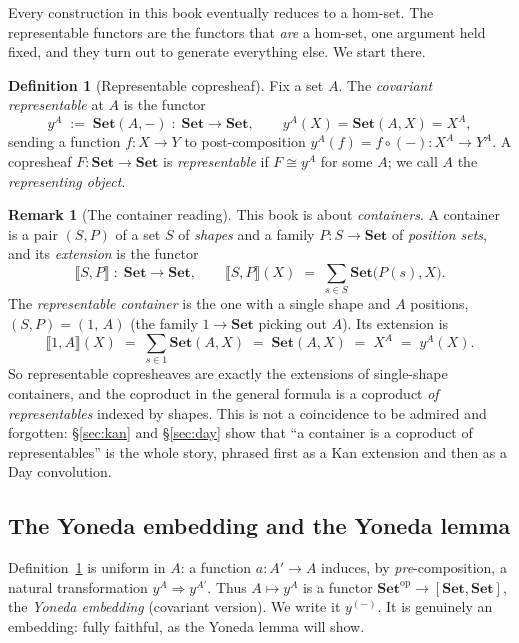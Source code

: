 \documentclass[11pt]{article}
\theoremstyle{plain}
\theoremstyle{definition}
\newtheorem{definition}[theorem]{Definition}
\newtheorem{remark}[theorem]{Remark}
\newcommand{\Set}{\mathbf{Set}}
\newcommand{\op}{^{\mathrm{op}}}
\newcommand{\yA}{y^{A}}
\newcommand{\iso}{\cong}
\newcommand{\ext}[1]{\llbracket #1 \rrbracket}
\begin{document}
Every construction in this book eventually reduces to a hom-set. The
representable functors are the functors that \emph{are} a hom-set, one argument
held fixed, and they turn out to generate everything else. We start there.

\begin{definition}[Representable copresheaf]
\label{def:rep}
Fix a set $A$. The \emph{covariant representable} at $A$ is the functor
\[
  \yA \;:=\; \Set(A,-)\;:\;\Set \longrightarrow \Set,
  \qquad
  \yA(X) = \Set(A,X) = X^{A},
\]
sending a function $f\colon X\to Y$ to post-composition
$\yA(f) = f\circ(-)\colon X^{A}\to Y^{A}$. A copresheaf $F\colon\Set\to\Set$ is
\emph{representable} if $F\iso\yA$ for some $A$; we call $A$ the
\emph{representing object}.
\end{definition}

\begin{remark}[The container reading]
\label{rem:containerrep}
This book is about \emph{containers}. A container is a pair $(S,P)$ of a set $S$
of \emph{shapes} and a family $P\colon S\to\Set$ of \emph{position sets}, and its
\emph{extension} is the functor
\[
  \ext{S,P}\;:\;\Set\to\Set,
  \qquad
  \ext{S,P}(X) \;=\; \sum_{s\in S}\Set\!\bigl(P(s),X\bigr).
\]
The \emph{representable container} is the one with a single shape and $A$
positions, $(S,P)=(1,\,A)$ (the family $1\to\Set$ picking out $A$). Its extension
is
\[
  \ext{1,A}(X) \;=\; \sum_{s\in 1}\Set(A,X) \;=\; \Set(A,X) \;=\; X^{A} \;=\; \yA(X).
\]
So representable copresheaves are exactly the extensions of single-shape
containers, and the coproduct in the general formula is a coproduct \emph{of
representables} indexed by shapes. This is not a coincidence to be admired and
forgotten: \S\ref{sec:kan} and \S\ref{sec:day} show that ``a container is a
coproduct of representables'' is the whole story, phrased first as a Kan
extension and then as a Day convolution.
\end{remark}

\subsection{The Yoneda embedding and the Yoneda lemma}

Definition~\ref{def:rep} is uniform in $A$: a function $a\colon A'\to A$ induces,
by \emph{pre}-composition, a natural transformation $\yA\Rightarrow y^{A'}$. Thus
$A\mapsto\yA$ is a functor $\Set\op\to[\Set,\Set]$, the \emph{Yoneda embedding}
(covariant version). We write it $y^{(-)}$. It is genuinely an embedding: fully
faithful, as the Yoneda lemma will show.
\end{document}
